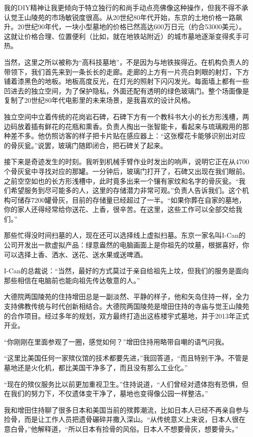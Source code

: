 \documentclass[12pt,oneside]{book}
\begin{document}
\begin{bookref}[frametitle={\cite{好好告别}}]
我的DIY精神让我更倾向于特立独行的和尚手动点亮佛像这种操作，但我不得不承认觉王山陵苑的市场敏锐度很高。从20世纪80年代开始，东京的土地价格一路飙升。20世纪90年代，一块小型墓地的价格已然高达600万日元（约合53000美元）。这就让价格合理、位置便利（比如，就在地铁站附近）的城市墓地逐渐变得炙手可热。

当然，这里之所以被称为“高科技墓地”，不是因为与地铁挨得近。在机构负责人的带领下，我们首先来到一条长长的走廊。走廊的上方有一片亮白刺眼的射灯，下方铺着漆黑色的地板。地板高度反光，在灯光的照射下闪闪发光。每面墙上都有一些凹进去的独立空间，为了保护隐私，外面还配有透明的绿色玻璃门。整个场面像是复制了20世纪80年代电影里的未来场景，是我喜欢的设计风格。

独立空间中立着传统的花岗岩石碑，石碑下方有一个教科书大小的长方形浅槽，两边码放着插有鲜花的花瓶和熏香。负责人掏出一张智能卡，看起来与琉璃殿用的那种差不多。他仿照访客的样子把卡片贴在感应器上：“这张樱花卡能够识别出对应的骨灰瓮。”说罢，玻璃门随即闭合，把石碑关了起来。

接下来是奇迹发生的时刻。我听到机械手臂作业时发出的响声，说明它正在从4700个骨灰瓮中寻找对应的那罐。一分钟后，玻璃门打开了，石碑又出现在我们眼前。之前空空如也的长方形浅槽中，此时竟多出来一个镶有家纹和名字的骨灰瓮。“我们希望服务到尽可能多的人，这里的存储潜力非常可观。”负责人告诉我们。这个机构可储存7200罐骨灰，目前的存储量已经超过了一半。“如果你葬在自家的墓地，你的家人还得经常给你送花、上香，很辛苦。在这里，这些工作可以全部交给我们。”

那些忙得没时间扫墓的人，现在还可以选择线上虚拟扫墓。东京一家名叫I-Can的公司开发出一款虚拟产品：绿意盎然的电脑画面上是你祖先的坟墓，根据喜好，你可以选择上香、洒水、送花、送水果或送啤酒。

I-Can的总裁说：“当然，最好的方式莫过于亲自给祖先上坟，但我们的服务是面向那些相信在电脑前也能向祖先传达敬意的人。”

大德院两国陵苑的住持增田总是一副淡然、平静的样子，他和矢岛住持一样，全力支持佛教传统与时代创新相结合。大德院两国陵苑是增田住持的寺庙与觉王山陵苑的合作项目。经过多年的规划，双方最终打造出这栋楼宇式墓地，并于2013年正式开业。

“你刚刚在里面参观了一圈，感觉如何？”增田住持用略带自嘲的语气问我。

“这里比美国任何一家殡仪馆的技术都要先进，”我回答道，“而且特别干净。不管是墓地还是火化机，都比美国干净多了，而且没有那么工业化。”

“现在的殡仪服务比以前更加重视卫生。”住持说道，“人们曾经对遗体抱有恐惧，但在我们的努力下，不仅遗体变干净了，墓地也变得像公园一样整洁。”

我和增田住持聊了很多日本和美国当前的殡葬潮流，比如日本人已经不再亲自参与捡骨，而是让工作人员把遗骨碾碎并撒入深山。“从传统意义上来说，日本人很在意白骨，”他解释道，“所以日本有捡骨的风俗。日本人不想要骨灰，想要骨头。”


\end{bookref}
\end{document}

